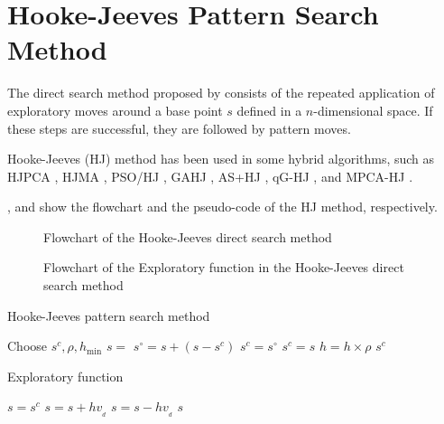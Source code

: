 \section{Hooke-Jeeves Pattern Search Method}
\label{sec:hj}

The direct search method proposed by  consists of the repeated application of exploratory moves around a base point $s$ defined in a $n$-dimensional space. If these steps are successful, they are followed by pattern moves.

Hooke-Jeeves (HJ) method has been used in some hybrid algorithms, such as HJPCA \cite{RiosCoelho2010843}, HJMA \cite{Moser2009AHB}, PSO/HJ \cite{kampf2010comparison}, GAHJ \cite{long2014hybrid}, AS+HJ \cite{Braun2015}, qG-HJ \cite{HernandezTorres2015}, and MPCA-HJ \cite{HernandezTorres2015b}.

, and  show the flowchart and the pseudo-code of the HJ method, respectively.

\begin{figure}[H]
\caption{Flowchart of the Hooke-Jeeves direct search method}
\label{fig:hj}
\centering
\vspace{1em}
\end{figure}

\begin{figure}[H]
\caption{Flowchart of the Exploratory function in the Hooke-Jeeves direct search method}
\label{fig:hje}
\centering
\vspace{1em}
\end{figure}

\begin{algorithm}[H]
\caption{Hooke-Jeeves pattern search method}
\label{alg:hj}
\begin{algorithmic}[1]
\footnotesize     
\State Choose $s^c, \rho, h_{\mathrm{min}}$
  
\State $s =$ 
\State $s^{\circ} = s + (s - s^c)$
\State $s^c = s^{\circ}$
\Else
\State $s^c = s$
\EndIf
\Else
\State $h = h \times \rho$
\EndIf
\EndWhile
\State \Return $s^c$
\end{algorithmic}
\end{algorithm}

\begin{algorithm}[H]
\caption{Exploratory function}
\label{alg:hjexploratory}
\begin{algorithmic}[1]
\footnotesize
{}
\State $s = s^c$
\State $s = s + h v_{_d}$
\State $s = s - h v_{_d}$
\EndIf
\EndFor
\State \Return $s$
\EndFunction
\end{algorithmic}
\end{algorithm}

